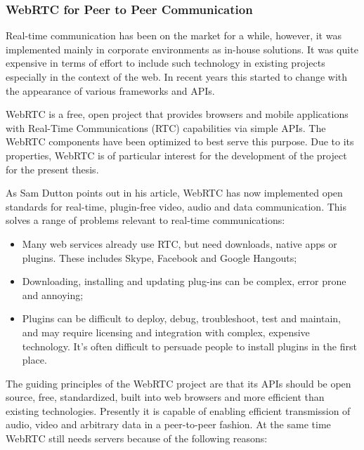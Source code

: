 \newpage

\subsubsection{WebRTC for Peer to Peer Communication} %

Real-time communication has been on the market for a while, however, it was
implemented mainly in corporate environments as in-house solutions. It was quite
expensive in terms of effort to include such technology in existing projects
especially in the context of the web. In recent years this started to change
with the appearance of various frameworks and APIs.

WebRTC\cite{webrtc_org} is a free, open project that provides browsers and
mobile applications with Real-Time Communications (RTC) capabilities via simple
APIs. The WebRTC components have been optimized to best serve this purpose.
Due to its properties, WebRTC is of particular interest for the development
of the project for the present thesis.

As Sam Dutton points out in his article\cite{webrtc_basics}, WebRTC has now
implemented open standards for real-time, plugin-free video, audio and data
communication. This solves a range of problems relevant to real-time
communications:

\begin{itemize}
    \item Many web services already use RTC, but need downloads, native apps or
        plugins. These includes Skype, Facebook and Google Hangouts;

    \item Downloading, installing and updating plug-ins can be complex, error
        prone and annoying;

    \item Plugins can be difficult to deploy, debug, troubleshoot, test and
        maintain, and may require licensing and integration with complex,
        expensive technology. It's often difficult to persuade people to install
        plugins in the first place.
\end{itemize}

The guiding principles of the WebRTC project are that its APIs should be open
source, free, standardized, built into web browsers and more efficient than
existing technologies. Presently it is capable of enabling efficient
transmission of audio, video and arbitrary data in a peer-to-peer fashion. At
the same time WebRTC still needs servers because of the following
reasons\cite{webrtc_realworld}:


